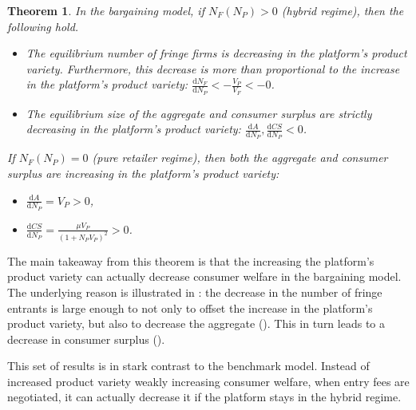 \documentclass[a4paper]{article}
\newtheorem{theorem}{Theorem}
\newcommand{\dd}{\mathrm{d}}
\begin{document}
\begin{theorem}
    \label{prop:equilibrium_bargaining}
    In the bargaining model, if $N_F(N_P) > 0$ (hybrid regime), then the following hold.
    \begin{itemize}
        \item The equilibrium number of fringe firms is decreasing in the platform's product variety. Furthermore, this decrease is more than proportional to the increase in the platform's product variety: $\frac{\dd N_F}{\dd N_P} < -\frac{V_P}{V_F} < -0$.
        \item The equilibrium size of the aggregate and consumer surplus are strictly decreasing in the platform's product variety: $\frac{\dd A}{\dd N_P}, \frac{\dd CS}{\dd N_P} < 0$.
    \end{itemize}
    If $N_F(N_P) = 0$ (pure retailer regime), then both the aggregate and consumer surplus are increasing in the platform's product variety:
    \begin{itemize}
        \item $\frac{\dd A}{\dd N_P} = V_P > 0$,
        \item $\frac{\dd CS}{\dd N_P} = \frac{\mu V_P}{(1 + N_P V_P)^2} > 0$.
    \end{itemize}
\end{theorem}

The main takeaway from this theorem is that the increasing the platform's product variety can actually decrease consumer welfare in the bargaining model.
The underlying reason is illustrated in : the decrease in the number of fringe entrants is large enough to not only to offset the increase in the platform's product variety, but also to decrease the aggregate ().
This in turn leads to a decrease in consumer surplus ().

This set of results is in stark contrast to the benchmark model.
Instead of increased product variety weakly increasing consumer welfare, when entry fees are negotiated, it can actually decrease it if the platform stays in the hybrid regime.
\end{document}
